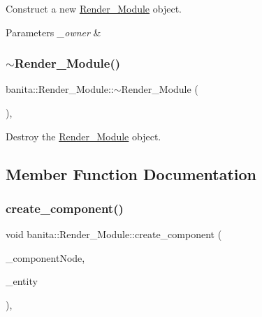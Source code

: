 Construct a new \mbox{\hyperlink{classbanita_1_1_render___module}{Render\+\_\+\+Module}} object. 


\begin{DoxyParams}{Parameters}
{\em \+\_\+owner} & \\
\hline
\end{DoxyParams}
\mbox{\label{classbanita_1_1_render___module_a338c9943a6a739c0a2517203c2986d2d}} 
\subsubsection{\texorpdfstring{$\sim$Render\_Module()}{~Render\_Module()}}
{\footnotesize\ttfamily banita\+::\+Render\+\_\+\+Module\+::$\sim$\+Render\+\_\+\+Module (\begin{DoxyParamCaption}{ }\end{DoxyParamCaption})\hspace{0.3cm}{\ttfamily [inline]}, {\ttfamily [override]}}



Destroy the \mbox{\hyperlink{classbanita_1_1_render___module}{Render\+\_\+\+Module}} object. 



\subsection{Member Function Documentation}
\mbox{\label{classbanita_1_1_render___module_a639688937a247c3fcc21e720ec0982b7}} 
\subsubsection{\texorpdfstring{create\_component()}{create\_component()}}
{\footnotesize\ttfamily void banita\+::\+Render\+\_\+\+Module\+::create\+\_\+component (\begin{DoxyParamCaption}\item[{X\+M\+L\+\_\+\+Node $\ast$}]{\+\_\+component\+Node,  }\item[{\mbox{\hyperlink{classbanita_1_1_entity}{Entity}} $\ast$}]{\+\_\+entity }\end{DoxyParamCaption})\hspace{0.3cm}{\ttfamily [override]}, {\ttfamily [virtual]}}



